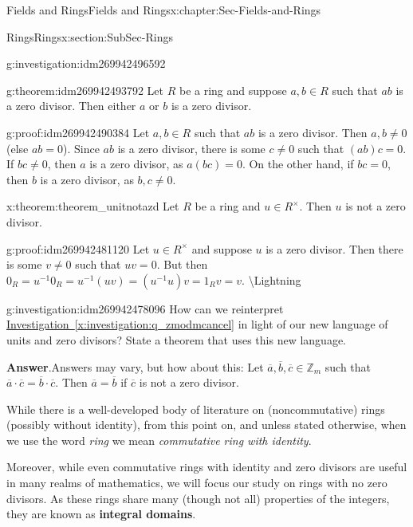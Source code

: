 \documentclass[oneside,10pt,]{book}
\newcommand{\terminology}[1]{\textbf{#1}}
\numberwithin{equation}{section}
\def\Z{{\mathbb Z}}
\begin{document}
\begin{chapterptx}{Fields and Rings}{}{Fields and Rings}{}{}{x:chapter:Sec-Fields-and-Rings}
\begin{sectionptx}{Rings}{}{Rings}{}{}{x:section:SubSec-Rings}
\begin{investigation}{}{g:investigation:idm269942496592}
\end{investigation}
\begin{theorem}{}{}{g:theorem:idm269942493792}%
Let \(R\) be a ring and suppose \(a,b\in R\) such that \(ab\) is a zero divisor. Then either \(a\) or \(b\) is a zero divisor.%
\end{theorem}
\begin{proofptx}{}{g:proof:idm269942490384}
Let \(a,b\in R\) such that \(ab\) is a zero divisor. Then \(a,b\ne 0\) (else \(ab = 0\)). Since \(ab\) is a zero divisor, there is some \(c\ne 0\) such that \((ab) c = 0\). If \(bc\ne 0\), then \(a\) is a zero divisor, as \(a(bc) = 0\). On the other hand, if \(bc=0\), then \(b\) is a zero divisor, as \(b,c\ne 0\).%
\end{proofptx}
\begin{theorem}{}{}{x:theorem:theorem_unitnotazd}%
Let \(R\) be a ring and \(u\in R^\times\). Then \(u\) is not a zero divisor.%
\end{theorem}
\begin{proofptx}{}{g:proof:idm269942481120}
Let \(u\in R^\times\) and suppose \(u\) is a zero divisor. Then there is some \(v\ne 0\) such that \(uv = 0\). But then \(0_R = u^{-1} 0_R = u^{-1} (uv) = (u^{-1} u) v = 1_R v = v\). \textbackslash{}Lightning%
\end{proofptx}
\begin{investigation}{}{g:investigation:idm269942478096}%
How can we reinterpret \hyperref[x:investigation:q_zmodmcancel]{Investigation~\ref{x:investigation:q_zmodmcancel}} in light of our new language of units and zero divisors? State a theorem that uses this new language.%
\par\smallskip%
\noindent\textbf{Answer}.\hypertarget{g:answer:idm269942476320}{}\quad{}Answers may vary, but how about this: Let \(\overline{a},\overline{b},\overline{c}\in \Z_m\) such that \(\overline{a}\cdot \overline{c} = \overline{b}\cdot \overline{c}\). Then \(\overline{a} = \overline{b}\) if \(\overline{c}\) is not a zero divisor.%
\end{investigation}
While there is a well-developed body of literature on (noncommutative) rings (possibly without identity), from this point on, and unless stated otherwise, when we use the word \emph{ring} we mean \emph{commutative ring with identity}.%
\par
Moreover, while even commutative rings with identity and zero divisors are useful in many realms of mathematics, we will focus our study on rings with no zero divisors. As these rings share many (though not all) properties of the integers, they are known as \terminology{integral domains}.%

\end{sectionptx}
\end{chapterptx}
\end{document}
